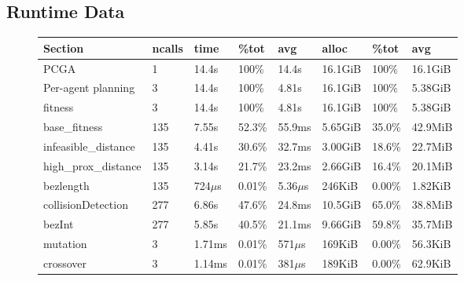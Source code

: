 \begin{appendices}

  \chapter{Runtime Data}
  \begin{figure}
    \begin{tabular}{l l l l l l l l}
       Section                       &ncalls     &time   &\%tot     &avg     &alloc   &\%tot      &avg\\
\hline
PCGA                        &   1  &  14.4s &  100\% &  14.4s   &16.1GiB  &100\%   &16.1GiB\\
  \hspace{6pt} Per-agent planning &   3  &  14.4s &  100\% &  4.81s   &16.1GiB  &100\%   &5.38GiB\\
     \hspace{12pt}fitness                     &   3  &  14.4s &  100\% &  4.81s   &16.1GiB  &100\%   &5.38GiB\\
       \hspace{24pt}base\_fitness              & 135  &  7.55s & 52.3\% & 55.9ms   &5.65GiB  &35.0\%  &42.9MiB\\
         \hspace{30pt}infeasible\_distance     & 135  &  4.41s & 30.6\% & 32.7ms   &3.00GiB  &18.6\%  &22.7MiB\\
         \hspace{30pt}high\_prox\_distance      & 135  &  3.14s & 21.7\% & 23.2ms   &2.66GiB  &16.4\%  &20.1MiB\\
         \hspace{30pt}bezlength               & 135  &  724\(\mu\)s & 0.01\% & 5.36\(\mu\)s   & 246KiB  &0.00\%  &1.82KiB\\
       \hspace{24pt}collisionDetection        & 277  &  6.86s & 47.6\% & 24.8ms   &10.5GiB  &65.0\%  &38.8MiB\\
         \hspace{30pt}bezInt                  & 277  &  5.85s & 40.5\% & 21.1ms   &9.66GiB  &59.8\%  &35.7MiB\\
     \hspace{12pt}mutation                    &   3  & 1.71ms & 0.01\% &  571\(\mu\)s   & 169KiB  &0.00\%  &56.3KiB\\
     \hspace{12pt}crossover                   &   3  & 1.14ms & 0.01\% &  381\(\mu\)s   & 189KiB  &0.00\%  &62.9KiB\\

\end{tabular}
\end{figure}
\end{appendices}
